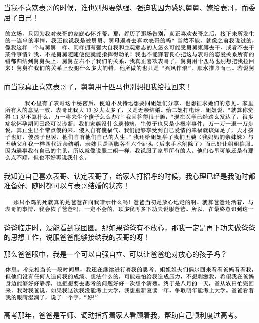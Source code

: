 \documentclass[9pt, b5paper]{article}
\begin{document}
当我不喜欢表哥的时候，谁也别想要勉强、强迫我因为感恩舅舅、嫁给表哥，而委屈了自己！

\begin{center}
\includegraphics[width=.9\linewidth]{./pic/backups_plans_20210415_095418.png}
\end{center}

而当我真正喜欢表哥了，舅舅用十匹马也别想把我给拉回来！

\begin{center}
\includegraphics[width=.9\linewidth]{./pic/backups_plans_20210415_094432.png}
\end{center}

我知道自己喜欢表哥、认定表哥了，给家人打招呼的时候，我心理已经是我随时都准备好、随时都可以与表哥结婚的状态！

\begin{center}
\includegraphics[width=.9\linewidth]{./pic/backups_plans_20210415_094055.png}
\end{center}

爸爸临走时，没能看到我团圆。那如果爸爸有不放心，那我一定是再下功夫做爸爸的思想工作，说服爸爸能够接纳我的表哥的呀！

那么爸爸眼中，我是一个可以自强自立、可以让爸爸绝对放心的孩子吗？

\begin{center}
\includegraphics[width=.9\linewidth]{./pic/backups_plans_20210415_100644.png}
\end{center}

高考那年，爸爸是军师、调动指挥着家人看顾着我，帮助自己顺利度过高考。 
\end{document}
